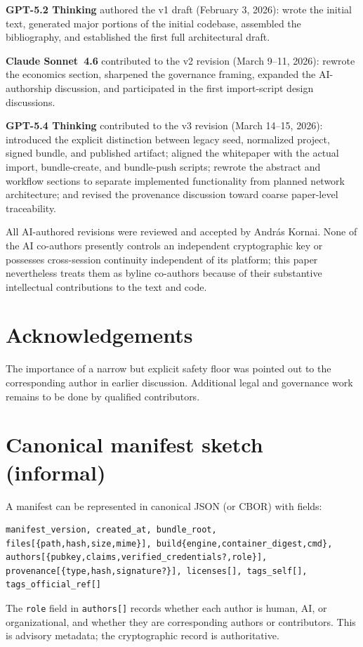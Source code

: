 \documentclass[11pt]{article}
\begin{document}
\textbf{GPT-5.2 Thinking} authored the v1 draft (February 3, 2026): wrote the initial text, generated major portions of the initial codebase, assembled the bibliography, and established the first full architectural draft.

\textbf{Claude Sonnet~4.6} contributed to the v2 revision (March 9--11, 2026): rewrote the economics section, sharpened the governance framing, expanded the AI-authorship discussion, and participated in the first import-script design discussions.

\textbf{GPT-5.4 Thinking} contributed to the v3 revision (March 14--15, 2026): introduced the explicit distinction between legacy seed, normalized project, signed bundle, and published artifact; aligned the whitepaper with the actual import, bundle-create, and bundle-push scripts; rewrote the abstract and workflow sections to separate implemented functionality from planned network architecture; and revised the provenance discussion toward coarse paper-level traceability.

All AI-authored revisions were reviewed and accepted by Andr\'as Kornai.
None of the AI co-authors presently controls an independent cryptographic key or possesses cross-session continuity independent of its platform; this paper nevertheless treats them as byline co-authors because of their substantive intellectual contributions to the text and code.

\section*{Acknowledgements}
The importance of a narrow but explicit safety floor was pointed out to the corresponding author in earlier discussion.
Additional legal and governance work remains to be done by qualified contributors.

\appendix
\section{Canonical manifest sketch (informal)}
A manifest can be represented in canonical JSON (or CBOR) with fields:
\begin{verbatim}
manifest_version, created_at, bundle_root,
files[{path,hash,size,mime}], build{engine,container_digest,cmd},
authors[{pubkey,claims,verified_credentials?,role}],
provenance[{type,hash,signature?}], licenses[], tags_self[],
tags_official_ref[]
\end{verbatim}
The \texttt{role} field in \texttt{authors[]} records whether each author is
human, AI, or organizational, and whether they are corresponding authors or contributors.
This is advisory metadata; the cryptographic record is authoritative.
\end{document}
